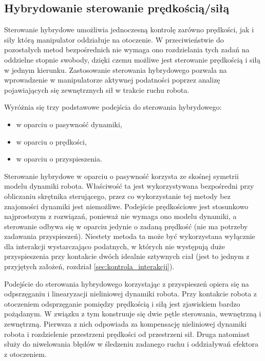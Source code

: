 \documentclass[printmode]{mgr}
\begin{document}
\subsection{Hybrydowanie sterowanie prędkością/siłą}
Sterowanie hybrydowe umożliwia jednoczesną kontrolę zarówno prędkości, jak i siły którą manipulator oddziałuje na otoczenie. 
W przeciwieństwie do pozostałych metod bezpośrednich nie wymaga ono rozdzielania tych zadań na oddzielne stopnie swobody,
dzięki czemu możliwe jest sterowanie prędkością i siłą w jednym kierunku. Zastosowanie sterowania hybrydowego pozwala na
wprowadzenie w manipulatorze aktywnej podatności poprzez analizę pojawiających się zewnętrznych sił w trakcie ruchu robota.

Wyróżnia się trzy podstawowe podejścia do sterowania hybrydowego:
\begin{itemize}
\item w oparciu o pasywność dynamiki,
\item w oparciu o prędkości,
\item w oparciu o przyspieszenia.
\end{itemize}

Sterowanie hybrydowe w oparciu o pasywność korzysta ze skośnej symetrii modelu dynamiki robota. Właściwość ta jest
wykorzystywana bezpośredni przy obliczaniu skrętnika sterującego, przez co wykorzystanie tej metody bez znajomości dynamiki jest niemożliwe.
Podejście prędkościowe jest stosunkowo najprostszym z rozwiązań, ponieważ nie wymaga ono modelu dynamiki, a sterowanie
odbywa się w oparciu jedynie o zadaną prędkość (nie ma potrzeby zadawania przyspieszeń). Niestety metoda ta może być
wykorzystana wyłącznie dla interakcji wystarczająco podatnych, w których nie występują duże przyspieszenia
przy kontakcie dwóch idealnie sztywnych ciał (jest to jednym z przyjętych założeń, rozdział \ref{sec:kontrola_interakcji}).

Podejście do sterowania hybrydowego korzystając z przyspieszeń opiera się na odpsrzęganiu i linearyzacji nieliniowej dynamiki
robota. Przy kontakcie robota z otoczeniem odsprzęganie pomiędzy prędkością i siłą jest zjawiskiem bardzo pożądanym. 
W związku z tym konstruuje się dwie pętle sterowania, wewnętrzną i zewnętrzną. Pierwsza z nich
odpowiada za kompensację nieliniowej dynamiki robota i rozdzielenie przestrzeni prędkości od przestrzeni sił. 
Druga natomiast służy do niwelowania błędów w śledzeniu zadanego ruchu i oddziaływań efektora z otoczeniem.
\end{document}
